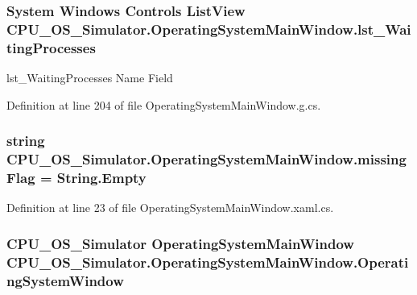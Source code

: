 \subsubsection[{lst\+\_\+\+Waiting\+Processes}]{\setlength{\rightskip}{0pt plus 5cm}System Windows Controls List\+View C\+P\+U\+\_\+\+O\+S\+\_\+\+Simulator.\+Operating\+System\+Main\+Window.\+lst\+\_\+\+Waiting\+Processes}\label{class_c_p_u___o_s___simulator_1_1_operating_system_main_window_a70185c0d33e102e203d76b79ac5c77db}


lst\+\_\+\+Waiting\+Processes Name Field 



Definition at line 204 of file Operating\+System\+Main\+Window.\+g.\+cs.

\hypertarget{class_c_p_u___o_s___simulator_1_1_operating_system_main_window_ad3dd5030de453dd97f236e7677ab6732}{}
\subsubsection[{missing\+Flag}]{\setlength{\rightskip}{0pt plus 5cm}string C\+P\+U\+\_\+\+O\+S\+\_\+\+Simulator.\+Operating\+System\+Main\+Window.\+missing\+Flag = String.\+Empty\hspace{0.3cm}{\ttfamily [private]}}\label{class_c_p_u___o_s___simulator_1_1_operating_system_main_window_ad3dd5030de453dd97f236e7677ab6732}


Definition at line 23 of file Operating\+System\+Main\+Window.\+xaml.\+cs.

\hypertarget{class_c_p_u___o_s___simulator_1_1_operating_system_main_window_ad42ee30cd6108b34ac88e9721db11b75}{}
\subsubsection[{Operating\+System\+Window}]{\setlength{\rightskip}{0pt plus 5cm}C\+P\+U\+\_\+\+O\+S\+\_\+\+Simulator {\bf Operating\+System\+Main\+Window} C\+P\+U\+\_\+\+O\+S\+\_\+\+Simulator.\+Operating\+System\+Main\+Window.\+Operating\+System\+Window\hspace{0.3cm}{\ttfamily [package]}}\label{class_c_p_u___o_s___simulator_1_1_operating_system_main_window_ad42ee30cd6108b34ac88e9721db11b75}


